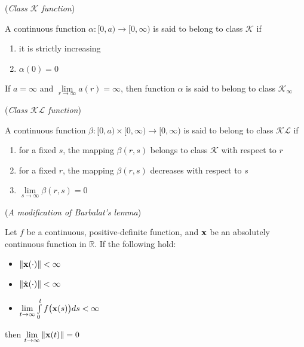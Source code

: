 \begin{bw_box}
\begin{definition}\cite{khalil_nonlinear_systems} (\textit{Class $\mathcal{K}$ function})
\label{def:k_class}

  A continuous function $\alpha : [0, a) \to [0, \infty)$
  is said to belong to class $\mathcal{K}$ if
  \begin{enumerate}
    \item it is strictly increasing
    \item $\alpha (0) = 0$
  \end{enumerate}
  If $a = \infty$ and $\lim\limits_{r \to \infty} a(r) = \infty$, then function
  $\alpha$ is said to belong to class $\mathcal{K}_{\infty}$
\end{definition}
\end{bw_box}

\begin{bw_box}
\begin{definition}\cite{khalil_nonlinear_systems} (\textit{Class $\mathcal{KL}$ function})
\label{def:kl_class}

  A continuous function $\beta : [0, a) \times [0, \infty) \to [0, \infty)$
  is said to belong to class $\mathcal{KL}$ if
  \begin{enumerate}
    \item for a fixed $s$, the mapping $\beta(r,s)$ belongs to class $\mathcal{K}$ with respect to $r$
    \item for a fixed $r$, the mapping $\beta(r,s)$ decreases with respect to $s$
    \item $\lim\limits_{s \to \infty} \beta(r,s) = 0$
  \end{enumerate}
\end{definition}
\end{bw_box}

\begin{bw_box}
  \begin{lemma} \cite{Fontes2007} (\textit{A modification of Barbalat's lemma})
  \label{lemma:barbalat}

    Let $f$ be a continuous, positive-definite function, and $\bm{\mathbf{x}}$ be an
    absolutely continuous function in $\mathbb{R}$. If the following hold:
  \begin{itemize}
    \item $\|\bm{\mathbf{x}}(\cdot)\| < \infty$
    \item $\|\dot{\bm{\mathbf{x}}}(\cdot)\| < \infty$
    \item $\lim\limits_{t \to \infty} \int\limits_0^t f\big(\bm{\mathbf{x}}(s)\big)ds < \infty$
  \end{itemize}
  then $\lim\limits_{t \to \infty} \|\bm{\mathbf{x}}(t)\| = 0$
  \end{lemma}
\end{bw_box}



